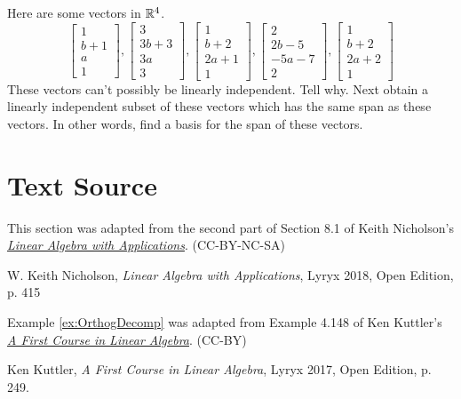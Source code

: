 \documentclass{ximera}
\begin{document}
\begin{problem}\label{prb:3.35} Here are some vectors in $\mathbb{R}^{4}$.
\begin{equation*}
\left[
\begin{array}{r}
1 \\
b+1 \\
a \\
1
\end{array}
\right] ,\left[
\begin{array}{r}
3 \\
3b+3 \\
3a \\
3
\end{array}
\right] ,\left[
\begin{array}{r}
1 \\
b+2 \\
2a+1 \\
1
\end{array}
\right] ,\left[
\begin{array}{r}
2 \\
2b-5 \\
-5a-7 \\
2
\end{array}
\right] ,\left[
\begin{array}{r}
1 \\
b+2 \\
2a+2 \\
1
\end{array}
\right]
\end{equation*}
These vectors can't possibly be linearly independent. Tell why. Next obtain a
linearly independent subset of these vectors which has the same span as
these vectors. In other words, find a basis for the span of these vectors.
\end{problem}







\section*{Text Source} This section was adapted from the second part of Section 8.1 of Keith Nicholson's \href{https://open.umn.edu/opentextbooks/textbooks/linear-algebra-with-applications}{\it Linear Algebra with Applications}. (CC-BY-NC-SA)

W. Keith Nicholson, {\it Linear Algebra with Applications}, Lyryx 2018, Open Edition, p. 415 

Example \ref{ex:OrthogDecomp}  was adapted from Example 4.148  of Ken Kuttler's \href{https://open.umn.edu/opentextbooks/textbooks/a-first-course-in-linear-algebra-2017}{\it A First Course in Linear Algebra}. (CC-BY)

Ken Kuttler, {\it  A First Course in Linear Algebra}, Lyryx 2017, Open Edition, p. 249. 
\end{document}
